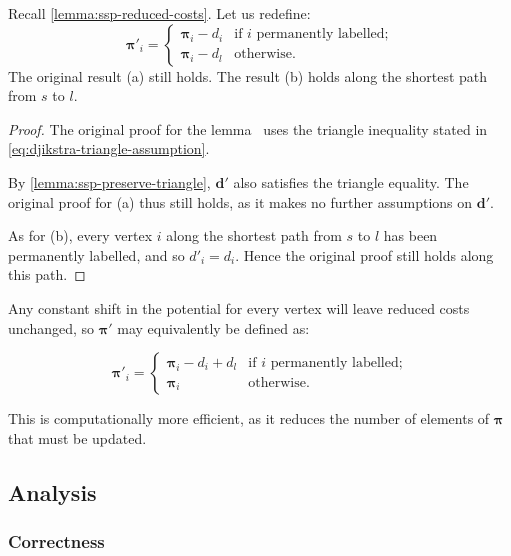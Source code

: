 \begin{lemma}
    Recall \cref{lemma:ssp-reduced-costs}. Let us redefine:
    {\normalfont
        \[\boldsymbol{\pi}'_{i}=\begin{cases}
        \boldsymbol{\pi}_{i}-d_{i} & \textrm{if $i$ permanently labelled;}\\
        \boldsymbol{\pi}_{i}-d_{l} & \textrm{otherwise.}
        \end{cases}\]}\noindent
The original result (a) still holds. The result (b) holds along the shortest path from $s$ to $l$\footnotemark.
\end{lemma}
\begin{proof}
    The original proof for the lemma~\cite[lemma~9.11]{Ahuja:1993} uses the triangle inequality stated in \cref{eq:djikstra-triangle-assumption}. 
    
    By \cref{lemma:ssp-preserve-triangle}, $\mathbf{d}'$ also satisfies the triangle equality. The original proof for (a) thus still holds, as it makes no further assumptions on $\mathbf{d}'$.
    
    As for (b), every vertex $i$ along the shortest path from $s$ to $l$ has been permanently labelled, and so $d'_i = d_i$. Hence the original proof still holds along this path.
\end{proof}

Any constant shift in the potential for every vertex will leave reduced costs unchanged, so $\boldsymbol{\pi}'$ may equivalently be defined as:

\[\boldsymbol{\pi}'_{i}=\begin{cases}
\boldsymbol{\pi}_{i}-d_i+d_l & \text{if $i$ permanently labelled;}\\
\boldsymbol{\pi}_{i} & \text{otherwise.}
\end{cases}\]

This is computationally more efficient, as it reduces the number of elements of $\boldsymbol{\pi}$ that must be updated.

\subsection{Analysis} \label{sec:impl-ssp-analysis}


\subsubsection{Correctness}


